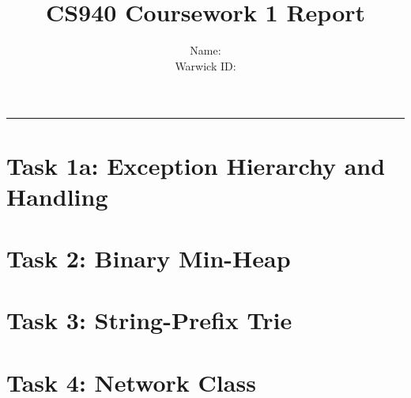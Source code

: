\documentclass[12pt, a4paper]{article}
\title{\userid{} CS940 Coursework 1 Report}
\author{
    Name: \studentname\\[1em]
    Warwick ID: \userid
}
\date{}
\begin{document}
\maketitle
\hrule

\section*{Task 1a: Exception Hierarchy and Handling}
\section*{Task 2: Binary Min-Heap}
\section*{Task 3: String-Prefix Trie}
\section*{Task 4: Network Class}
\end{document}
